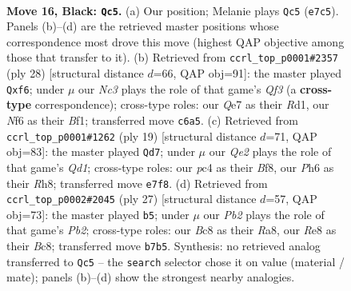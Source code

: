 \documentclass[11pt]{article}
\begin{document}
\clearpage

\begin{figure}[p]\centering
\begin{subfigure}{0.46\textwidth}\centering
\resizebox{\linewidth}{!}{%
\newchessgame
\chessboard[
  setfen={r1b1r1k1/ppp1qpp1/2n2n1p/P6P/2P2P2/2P1P3/3B4/R2QKBNR b KQ - 0 16},
  showmover=false,
  pgfstyle=straightmove, color=movearrow, markmove={e7-c5}
]}
\caption{}
\end{subfigure}\hfill
\begin{subfigure}{0.46\textwidth}\centering
\resizebox{\linewidth}{!}{%
\newchessgame
\chessboard[
  setfen={2r1kb1r/2qb1p2/p1nppp2/1p6/4P2P/PNN2Q2/1PP2P2/2KR1B1R w k - 0 15},
  showmover=false,
  pgfstyle=straightmove, color=movearrow, markmove={f3-f6}
]}
\caption{}
\end{subfigure}
\\[4pt]
\begin{subfigure}{0.46\textwidth}\centering
\resizebox{\linewidth}{!}{%
\newchessgame
\chessboard[
  setfen={r2qkb1r/1pp2ppp/p1n1pn2/8/P1BP4/1Q2PP1P/1P1B1P2/RN2K2R b KQkq - 2 10},
  showmover=false,
  pgfstyle=straightmove, color=movearrow, markmove={d8-d7}
]}
\caption{}
\end{subfigure}\hfill
\begin{subfigure}{0.46\textwidth}\centering
\resizebox{\linewidth}{!}{%
\newchessgame
\chessboard[
  setfen={r1bqk3/pp3p1p/4pnr1/4n3/2PpP3/P7/1P1Q1PPP/R1B1KBNR b KQq - 1 14},
  showmover=false,
  pgfstyle=straightmove, color=movearrow, markmove={b7-b5}
]}
\caption{}
\end{subfigure}
\caption{\textbf{Move 16, Black: \texttt{Qc5}.} (a) Our position; Melanie plays \texttt{Qc5} (\texttt{e7c5}). Panels (b)--(d) are the retrieved master positions whose correspondence most drove this move (highest QAP objective among those that transfer to it). (b) Retrieved from \texttt{ccrl\_top\_p0001\#2357} (ply 28) [structural distance $d$=66, QAP obj=91]: the master played \texttt{Qxf6}; under $\mu$ our \emph{Nc3} plays the role of that game's \emph{Qf3} (a \textbf{cross-type} correspondence); cross-type roles: our \emph{Q}e7 as their \emph{R}d1, our \emph{N}f6 as their \emph{B}f1; transferred move \texttt{c6a5}. (c) Retrieved from \texttt{ccrl\_top\_p0001\#1262} (ply 19) [structural distance $d$=71, QAP obj=83]: the master played \texttt{Qd7}; under $\mu$ our \emph{Qe2} plays the role of that game's \emph{Qd1}; cross-type roles: our \emph{p}c4 as their \emph{B}f8, our \emph{P}h6 as their \emph{R}h8; transferred move \texttt{e7f8}. (d) Retrieved from \texttt{ccrl\_top\_p0002\#2045} (ply 27) [structural distance $d$=57, QAP obj=73]: the master played \texttt{b5}; under $\mu$ our \emph{Pb2} plays the role of that game's \emph{Pb2}; cross-type roles: our \emph{B}c8 as their \emph{R}a8, our \emph{R}e8 as their \emph{B}c8; transferred move \texttt{b7b5}. Synthesis: no retrieved analog transferred to \texttt{Qc5} -- the \texttt{search} selector chose it on value (material / mate); panels (b)--(d) show the strongest nearby analogies.}
\label{fig:thought-m31}
\end{figure}
\end{document}
